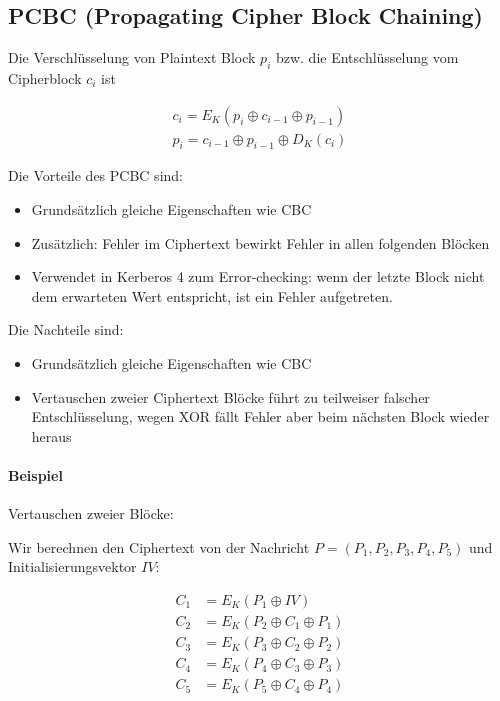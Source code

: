 \subsection{PCBC (Propagating Cipher Block Chaining)}

Die Verschlüsselung von Plaintext Block $p_i$ bzw. die Entschlüsselung vom Cipherblock $c_i$ ist

\begin{align*}
    c_i = E_K(p_i \oplus c_{i-1} \oplus p_{i-1}) \\
    p_i = c_{i-1} \oplus p_{i-1} \oplus D_K(c_i)
\end{align*}

Die Vorteile des PCBC sind: 

\begin{itemize}
    \item Grundsätzlich gleiche Eigenschaften wie CBC
    \item Zusätzlich: Fehler im Ciphertext bewirkt Fehler in allen folgenden Blöcken
    \item Verwendet in Kerberos 4 zum Error-checking: wenn der letzte Block nicht dem erwarteten Wert entspricht, ist ein Fehler aufgetreten.
\end{itemize}

Die Nachteile sind:

\begin{itemize}
    \item Grundsätzlich gleiche Eigenschaften wie CBC
    \item Vertauschen zweier Ciphertext Blöcke führt zu teilweiser falscher Entschlüsselung, wegen XOR fällt Fehler aber beim nächsten Block wieder heraus
\end{itemize}

\paragraph{Beispiel} Vertauschen zweier Blöcke:

Wir berechnen den Ciphertext von der Nachricht $P = (P_1, P_2, P_3, P_4, P_5)$ und Initialisierungsvektor $IV$:

\begin{align*}
    C_1 &= E_K(P_1 \oplus IV) \\
    C_2 &= E_K(P_2 \oplus C_1 \oplus P_1) \\
    C_3 &= E_K(P_3 \oplus C_2 \oplus P_2) \\
    C_4 &= E_K(P_4 \oplus C_3 \oplus P_3) \\
    C_5 &= E_K(P_5 \oplus C_4 \oplus P_4) \\
\end{align*}

